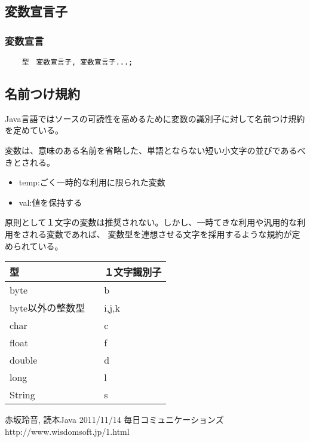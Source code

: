 \documentclass[12pt,a4j,twoside]{jsbook}
\begin{document}
\subsection{変数宣言子}
\subsubsection*{変数宣言}
\begin{lstlisting}
    型　変数宣言子, 変数宣言子...;
\end{lstlisting}
\subsection{名前つけ規約}
Java言語ではソースの可読性を高めるために変数の識別子に対して名前つけ規約を定めている。

変数は、意味のある名前を省略した、単語とならない短い小文字の並びであるべきとされる。
    \begin{itemize}
        \item temp:ごく一時的な利用に限られた変数
        \item val:値を保持する
    \end{itemize}
原則として１文字の変数は推奨されない。しかし、一時てきな利用や汎用的な利用をされる変数であれば、
変数型を連想させる文字を採用するような規約が定められている。
\begin{table}
    \begin{tabular}{|l|l|} \hline
        型　& １文字識別子\\ \hline
        byte & b \\
        byte以外の整数型　& i,j,k \\
        char & c\\
        float & f\\
        double & d \\
        long & l \\
        String & s \\ \hline
    \end{tabular} 
\end{table}
\begin{thebibliography}{9}


赤坂玲音,
読本Java 2011/11/14 毎日コミュニケーションズ
http://www.wisdomsoft.jp/1.html
\end{thebibliography}
\end{document}

